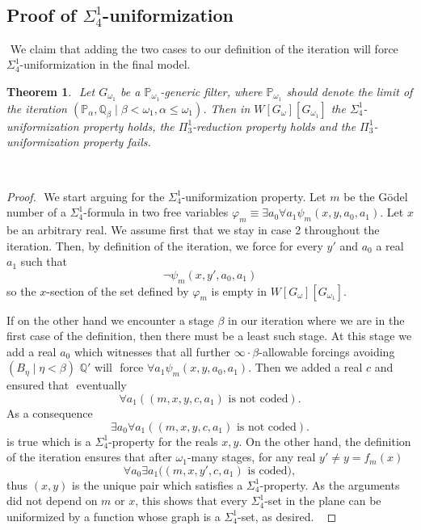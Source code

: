 \documentclass[a4paper,11pt]{article}
\newtheorem{theorem}{Theorem}[section]
\newcommand{\forceP}{\mathbb{P}}
\newcommand{\forceQ}{\mathbb{Q}}
\begin{document}
    ﻿  \subsection{Proof of \texorpdfstring{$\Sigma^1_4$}{Sigma14}-uniformization}
    ﻿
    We claim that adding the two cases to our definition of the iteration will force $\Sigma^1_4$-uniformization in the final model.
    ﻿
    \begin{theorem}
    ﻿
    Let $G_{\omega_1}$ be a $\forceP_{\omega_1}$-generic filter, where $\forceP_{\omega_1}$ should denote the limit of the iteration $(\forceP_{\alpha}, \forceQ_{\beta} \mid \beta < \omega_1, \alpha \le \omega_1)$.
    ﻿
    Then in $W[G_{\omega}] [G_{\omega_1}]$ the $\Sigma^1_4$-uniformization property holds, the $\Pi^1_3$-reduction property holds and the $\Pi^1_3$-uniformization property fails.
    ﻿
    \end{theorem}
    ﻿
    \begin{proof}
    ﻿
 We start arguing for the $\Sigma^1_4$-uniformization property.   Let $m$ be the G\"odel number of a $\Sigma^1_4$-formula in two free variables $\varphi_m \equiv \exists a_0 \forall a_1 \psi_m (x,y,a_0,a_1)$. Let $x$ be an arbitrary real. We assume first that we stay in case 2 throughout the iteration. Then, by definition of the iteration, we force for every $y'$ and $a_0$ a real $a_1$ such that
    ﻿
    \[ \lnot \psi_m (x,y',a_0,a_1) \]
so the $x$-section of the set defined by $\varphi_m$ is empty in $W[G_{\omega}][G_{\omega_1}]$. 


If on the other hand we encounter a stage $\beta$ in our iteration where we are in the first case of the definition, then there must be a least such stage. At this stage we add a real $a_0$ which witnesses that all further $\infty \cdot \beta$-allowable forcings avoiding $(B_{\eta} \mid \eta < \beta)$ $\forceQ'$ will
    ﻿
    force $\forall a_1 \psi_m (x,y,a_0,a_1)$. Then we added a real $c$ and ensured that
    ﻿
    eventually  
    ﻿
    \[ \forall a_1 ((m,x,y,c,a_1) \text{ is not coded}). \]
    ﻿
    As a consequence
    ﻿
    \[\exists a_0 \forall a_1 ((m,x,y,c,a_1) \text{ is not coded}). \] is true which is a $\Sigma^1_4$-property for the reals $x,y$.
    ﻿
    ﻿
    On the other hand, the definition of the iteration ensures that after $\omega_1$-many stages, for any real $y' \ne y=f_m(x)$
    ﻿
    \[ \forall a_0 \exists a_1 ((m,x,y',c,a_1) \text{ is coded)}, \] thus $(x,y)$ is the unique pair which satisfies a $\Sigma^1_4$-property. As the arguments did not depend on $m$ or $x$, this shows that every $\Sigma^1_4$-set in the plane can be uniformized by a function whose graph is a $\Sigma^1_4$-set, as desired.
   ﻿
    ﻿
    \end{proof}
\end{document}
